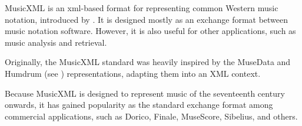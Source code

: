 


MusicXML is an \gls{xml}-based format for representing
common Western music notation, introduced by
\textcite{good2001musicxml}. It is designed mostly as an
exchange format between music notation software. However, it
is also useful for other applications, such as music
analysis and retrieval.

Originally, the MusicXML standard was heavily inspired by
the MuseData and Humdrum (see
) representations, adapting
them into an XML context.



Because MusicXML is designed to represent music of the
seventeenth century onwards, it has gained popularity as the
standard exchange format among commercial applications, such
as Dorico,
Finale,
MuseScore,
Sibelius, and
others.


